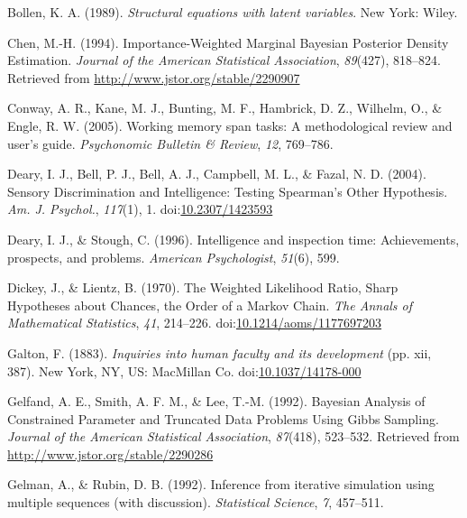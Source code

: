 \documentclass[
  ,man]{apa6}
\newlength{\cslhangindent}
\newenvironment{CSLReferences}[2] %
 {\begin{list}{}{%
  \setlength{\itemindent}{0pt}
  \setlength{\leftmargin}{0pt}
  \setlength{\parsep}{0pt}
  \ifodd #1
   \setlength{\leftmargin}{\cslhangindent}
   \setlength{\itemindent}{-1\cslhangindent}
  \fi
  \setlength{\itemsep}{#2\baselineskip}}}
 {\end{list}}
\begin{document}
\label{refs}
\begin{CSLReferences}{1}{0}
Bollen, K. A. (1989). \emph{Structural equations with latent variables}. New York: Wiley.

Chen, M.-H. (1994). Importance-{Weighted Marginal Bayesian Posterior Density Estimation}. \emph{Journal of the American Statistical Association}, \emph{89}(427), 818--824. Retrieved from \url{http://www.jstor.org/stable/2290907}

Conway, A. R., Kane, M. J., Bunting, M. F., Hambrick, D. Z., Wilhelm, O., \& Engle, R. W. (2005). Working memory span tasks: {A} methodological review and user's guide. \emph{Psychonomic Bulletin \& Review}, \emph{12}, 769--786.

Deary, I. J., Bell, P. J., Bell, A. J., Campbell, M. L., \& Fazal, N. D. (2004). Sensory {Discrimination} and {Intelligence}: {Testing Spearman}'s {Other Hypothesis}. \emph{Am. J. Psychol.}, \emph{117}(1), 1. doi:\href{https://doi.org/10.2307/1423593}{10.2307/1423593}

Deary, I. J., \& Stough, C. (1996). Intelligence and inspection time: Achievements, prospects, and problems. \emph{American Psychologist}, \emph{51}(6), 599.

Dickey, J., \& Lientz, B. (1970). The {Weighted Likelihood Ratio}, {Sharp Hypotheses} about {Chances}, the {Order} of a {Markov Chain}. \emph{The Annals of Mathematical Statistics}, \emph{41}, 214--226. doi:\href{https://doi.org/10.1214/aoms/1177697203}{10.1214/aoms/1177697203}

Galton, F. (1883). \emph{Inquiries into human faculty and its development} (pp. xii, 387). New York, NY, US: MacMillan Co. doi:\href{https://doi.org/10.1037/14178-000}{10.1037/14178-000}

Gelfand, A. E., Smith, A. F. M., \& Lee, T.-M. (1992). Bayesian {Analysis} of {Constrained Parameter} and {Truncated Data Problems Using Gibbs Sampling}. \emph{Journal of the American Statistical Association}, \emph{87}(418), 523--532. Retrieved from \url{http://www.jstor.org/stable/2290286}

Gelman, A., \& Rubin, D. B. (1992). Inference from iterative simulation using multiple sequences (with discussion). \emph{Statistical Science}, \emph{7}, 457--511.


\end{CSLReferences}
\end{document}
